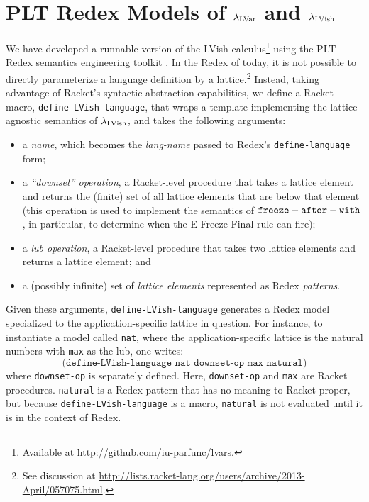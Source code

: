 \chapter{PLT Redex Models of $\lambda_{\textrm{LVar}}$ and $\lambda_{\textrm{LVish}}$}\label{app:plt-redex}


We have developed a runnable version of the LVish
calculus\footnote{Available at
  \url{http://github.com/iu-parfunc/lvars}.} using the PLT Redex
semantics engineering toolkit \cite{redex-book}.  In the Redex of
today, it is not possible to directly parameterize a language
definition by a lattice.\footnote{See discussion at
  \url{http://lists.racket-lang.org/users/archive/2013-April/057075.html}.}
Instead, taking advantage of Racket's syntactic abstraction
capabilities, we define a Racket macro,
\texttt{define-LVish-language}, that wraps a template implementing the
lattice-agnostic semantics of $\lambda_{\textrm{LVish}}$, and
takes the following arguments:
\begin{itemize}
\item a \emph{name}, which becomes the \emph{lang-name} passed to
  Redex's \texttt{define-language} form;
\item a \emph{``downset'' operation}, a Racket-level procedure that
  takes a lattice element and returns the (finite) set of all lattice
  elements that are below that element (this operation is used to
  implement the semantics of ${\mbox{\texttt{freeze}}-\mbox{\texttt{after}}-\mbox{\texttt{with}}}$, in particular, to determine when
  the {\sc E-Freeze-Final} rule can fire);
\item a \emph{lub operation}, a Racket-level procedure that takes two
  lattice elements and returns a lattice element; and
\item a (possibly infinite) set of \emph{lattice elements} represented
  as Redex \emph{patterns}.
\end{itemize}
Given these arguments, \texttt{define-LVish-language} generates a
Redex model specialized to the application-specific lattice in
question. For instance, to instantiate a model called \texttt{nat},
where the application-specific lattice is the natural numbers with
\texttt{max} as the lub, one writes:
\[
\texttt{(define-LVish-language nat downset-op max natural)}
\]
where \texttt{downset-op} is separately defined.  Here,
\texttt{downset-op} and \texttt{max} are Racket procedures.
\texttt{natural} is a Redex pattern that has no meaning to Racket
proper, but because \texttt{define-LVish-language} is a macro,
\texttt{natural} is not evaluated until it is in the context of
Redex.





